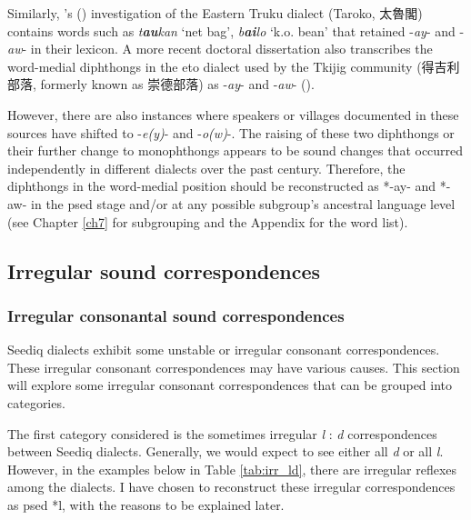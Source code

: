 Similarly, \citeauthor{tashiro1900easterntw}'s (\citeyear{tashiro1900easterntw}) investigation of the Eastern Truku dialect (Taroko, 太魯閣) contains words such as \textit{t\textbf{au}kan} `net bag', \textit{b\textbf{ai}lo} `k.o. bean' that retained -\textit{ay}- and -\textit{aw}- in their lexicon. A more recent doctoral dissertation also transcribes the word-medial diphthongs in the \acl{eto} dialect used by the Tkijig community (得吉利部落, formerly known as 崇德部落) as -\textit{ay}- and -\textit{aw}- (\cite{tsukida2009}).

However, there are also instances where speakers or villages documented in these sources have shifted to -\textit{e(y)}- and -\textit{o(w)}-. The raising of these two diphthongs or their further change to monophthongs appears to be sound changes that occurred independently in different dialects over the past century. Therefore, the diphthongs in the word-medial position should be reconstructed as *-ay- and *-aw- in the \acl{psed} stage and/or at any possible subgroup's ancestral language level (see Chapter \ref{ch7} for subgrouping and the Appendix for the word list).

\subsection{Irregular sound correspondences}

\subsubsection{Irregular consonantal sound correspondences}

Seediq dialects exhibit some unstable or irregular consonant correspondences. These irregular consonant correspondences may have various causes. This section will explore some irregular consonant correspondences that can be grouped into categories.

The first category considered is the sometimes irregular \textit{l} : \textit{d} correspondences between Seediq dialects. Generally, we would expect to see either all \textit{d} or all \textit{l}. However, in the examples below in Table \ref{tab:irr_ld}, there are irregular reflexes among the dialects. I have chosen to reconstruct these irregular correspondences as \acl{psed} *l, with the reasons to be explained later.

